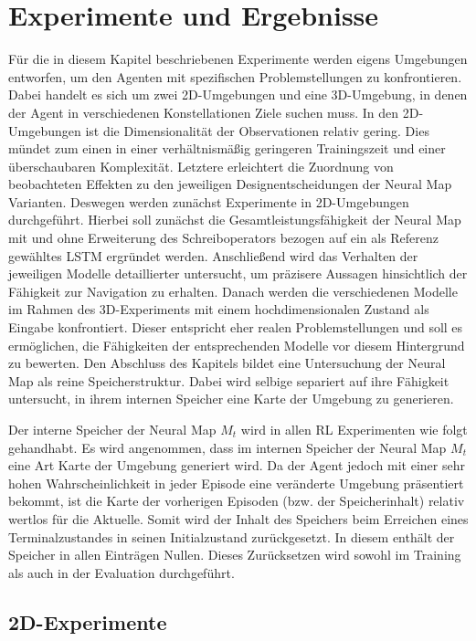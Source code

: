 \chapter{Experimente und Ergebnisse}
\label{chap_exp}

Für die in diesem Kapitel beschriebenen Experimente werden eigens Umgebungen entworfen, um den Agenten mit spezifischen Problemstellungen zu konfrontieren. Dabei handelt es sich um zwei 2D-Umgebungen und eine 3D-Umgebung, in denen der Agent in verschiedenen Konstellationen Ziele suchen muss. In den 2D-Umgebungen ist die Dimensionalität der Observationen relativ gering. Dies mündet zum einen in einer verhältnismäßig geringeren Trainingszeit und einer überschaubaren Komplexität. Letztere erleichtert die Zuordnung von beobachteten Effekten zu den jeweiligen Designentscheidungen der Neural Map Varianten. Deswegen werden zunächst Experimente in 2D-Umgebungen durchgeführt. Hierbei soll zunächst die Gesamtleistungsfähigkeit der Neural Map mit und ohne Erweiterung des Schreiboperators bezogen auf ein als Referenz gewähltes LSTM ergründet werden. Anschließend wird das Verhalten der jeweiligen Modelle detaillierter untersucht, um präzisere Aussagen hinsichtlich der Fähigkeit zur Navigation zu erhalten. Danach werden die verschiedenen Modelle im Rahmen des 3D-Experiments mit einem hochdimensionalen Zustand als Eingabe konfrontiert. Dieser entspricht eher realen Problemstellungen und soll es ermöglichen,  die Fähigkeiten der entsprechenden Modelle vor diesem Hintergrund zu bewerten. Den Abschluss des Kapitels bildet eine Untersuchung der Neural Map als reine Speicherstruktur. Dabei wird selbige separiert auf ihre Fähigkeit untersucht, in ihrem internen Speicher eine Karte der Umgebung zu generieren.

Der interne Speicher der Neural Map $M_t$ wird in allen RL Experimenten wie folgt gehandhabt. Es wird angenommen, dass im internen Speicher der Neural Map $M_t$ eine Art Karte der Umgebung generiert wird. Da der Agent jedoch mit einer sehr hohen Wahrscheinlichkeit in jeder Episode eine veränderte Umgebung präsentiert bekommt, ist die Karte der vorherigen Episoden (bzw. der Speicherinhalt) relativ wertlos für die Aktuelle. Somit wird der Inhalt des Speichers beim Erreichen eines Terminalzustandes in seinen Initialzustand zurückgesetzt. In diesem enthält der Speicher in allen Einträgen Nullen. Dieses Zurücksetzen wird sowohl im Training als auch in der Evaluation durchgeführt.

\section{2D-Experimente}
\label{sec_2d_exp}

